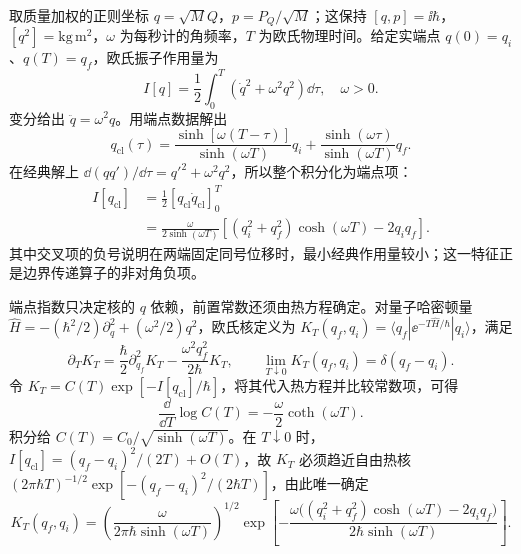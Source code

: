 \begin{example}

取质量加权的正则坐标 $q=\sqrt M Q$，$p=P_Q/\sqrt M$；这保持 $[q,p]=\ii\hbar$，$[q^2]=\mathrm{kg}\,\mathrm m^2$，$\omega$ 为每秒计的角频率，$T$ 为欧氏物理时间。给定实端点 $q(0)=q_i$、$q(T)=q_f$，欧氏振子作用量为
\[
I[q]=\frac12\int_0^T(\dot q^2+\omega^2q^2)\dd\tau,
\quad \omega>0.
\]
变分给出 $\ddot q=\omega^2q$。用端点数据解出
\[
q_{\mathrm{cl}}(\tau)=\frac{\sinh[\omega(T-\tau)]}{\sinh(\omega T)}q_i
+\frac{\sinh(\omega\tau)}{\sinh(\omega T)}q_f.
\]
在经典解上 $\dd(qq')/\dd\tau=q'^2+\omega^2q^2$，所以整个积分化为端点项：
\begin{align*}
I[q_{\mathrm{cl}}]
&=\frac12[q_{\mathrm{cl}}\dot q_{\mathrm{cl}}]_0^T\\
&=\frac\omega{2\sinh(\omega T)}
\left[(q_i^2+q_f^2)\cosh(\omega T)-2q_iq_f\right].
\end{align*}
其中交叉项的负号说明在两端固定同号位移时，最小经典作用量较小；这一特征正是边界传递算子的非对角负项。

端点指数只决定核的 $q$ 依赖，前置常数还须由热方程确定。对量子哈密顿量
$\widehat H=-(\hbar^2/2)\partial_q^2+(\omega^2/2)q^2$，欧氏核定义为 $K_T(q_f,q_i)=\langle q_f|\ee^{-T\widehat H/\hbar}|q_i\rangle$，满足
\[
\partial_TK_T=\frac\hbar2\partial_{q_f}^2K_T
-\frac{\omega^2q_f^2}{2\hbar}K_T,
\qquad\lim_{T\downarrow0}K_T(q_f,q_i)=\delta(q_f-q_i).
\]
令 $K_T=C(T)\exp[-I[q_{\mathrm{cl}}]/\hbar]$，将其代入热方程并比较常数项，可得
\[
\frac{\dd}{\dd T}\log C(T)=-\frac\omega2\coth(\omega T).
\]
积分给 $C(T)=C_0/\sqrt{\sinh(\omega T)}$。在 $T\downarrow0$ 时，$I[q_{\mathrm{cl}}]=(q_f-q_i)^2/(2T)+O(T)$，故 $K_T$ 必须趋近自由热核
$(2\pi\hbar T)^{-1/2}\exp[-(q_f-q_i)^2/(2\hbar T)]$，由此唯一确定
\begin{equation}\label{eq:ghs-r6-exact-mehler-kernel}
K_T(q_f,q_i)=\left(\frac{\omega}{2\pi\hbar\sinh(\omega T)}\right)^{1/2}
\exp\!\left[-\frac{\omega\bigl((q_i^2+q_f^2)\cosh(\omega T)-2q_iq_f\bigr)}{2\hbar\sinh(\omega T)}\right].
\end{equation}

\end{example}

